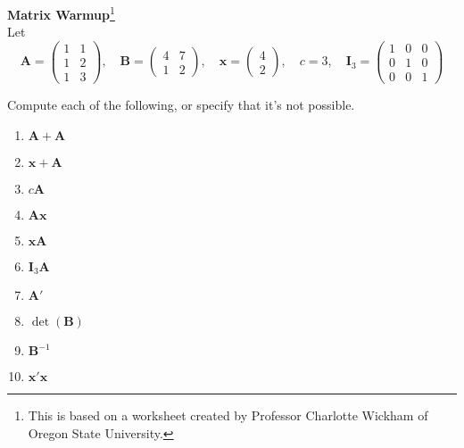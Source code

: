 \documentclass[11pt, fleqn]{article}\usepackage[]{graphicx}\usepackage[]{color}
\begin{document}
\setlength\parindent{0pt}

\large \textbf{Matrix Warmup}\footnote{This is based on a worksheet created by Professor Charlotte Wickham of Oregon State University.}\\

\normalsize Let
\[
\bm{A} =
\begin{pmatrix}
1 & 1\\
1 & 2\\
1 & 3 
\end{pmatrix},
\quad
\bm{B} = 
\begin{pmatrix}
4 & 7\\
1 & 2
\end{pmatrix},
\quad
\bm{x} = 
\begin{pmatrix}
4\\
2
\end{pmatrix},
\quad
c = 3,
\quad
\bm{I}_3 = 
\begin{pmatrix}
1 & 0 & 0\\
0 & 1 & 0\\
0 & 0 & 1
\end{pmatrix}
\]

Compute each of the following, or specify that it's not possible.
\begin{enumerate}
\item $\bm{A} + \bm{A}$\\
\vspace{11pt}

\item $\bm{x} + \bm{A}$\\
\vspace{11pt}

\item $c \bm{A}$\\
\vspace{11pt}

\item $\bm{A} \bm{x}$\\
\vspace{11pt}

\item $\bm{x} \bm{A}$\\
\vspace{11pt}

\item $\bm{I}_3 \bm{A}$\\
\vspace{11pt}

\item $\bm{A'}$\\
\vspace{11pt}

\item $\det(\bm{B})$\\
\vspace{11pt}

\item $\bm{B}^{-1}$\\
\vspace{11pt}

\item $\bm{x'}\bm{x}$\\
\end{enumerate}
\clearpage
\end{document}
